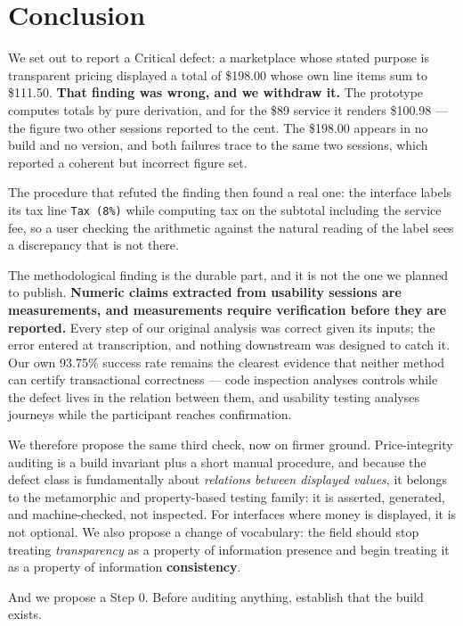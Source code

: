 \documentclass[conference]{IEEEtran}
\begin{document}
\section{Conclusion}

We set out to report a Critical defect: a marketplace whose stated purpose is transparent pricing
displayed a total of \$198.00 whose own line items sum to \$111.50. \textbf{That finding was wrong, and we
withdraw it.} The prototype computes totals by pure derivation, and for the \$89 service it renders
\$100.98 --- the figure two other sessions reported to the cent. The \$198.00 appears in no build and no
version, and both failures trace to the same two sessions, which reported a coherent but incorrect
figure set.

The procedure that refuted the finding then found a real one: the interface labels its tax line
\texttt{Tax (8\%)} while computing tax on the subtotal including the service fee, so a user checking the
arithmetic against the natural reading of the label sees a discrepancy that is not there.

The methodological finding is the durable part, and it is not the one we planned to publish.
\textbf{Numeric claims extracted from usability sessions are measurements, and measurements require
verification before they are reported.} Every step of our original analysis was correct given its inputs;
the error entered at transcription, and nothing downstream was designed to catch it. Our own 93.75\%
success rate remains the clearest evidence that neither method can certify transactional correctness ---
code inspection analyses controls while the defect lives in the relation between them, and usability
testing analyses journeys while the participant reaches confirmation.

We therefore propose the same third check, now on firmer ground. Price-integrity auditing is a build
invariant plus a short manual procedure, and because the defect class is fundamentally about
\emph{relations between displayed values}, it belongs to the metamorphic and property-based testing
family: it is asserted, generated, and machine-checked, not inspected. For interfaces where money is
displayed, it is not optional. We also propose a change of vocabulary: the field should stop treating
\emph{transparency} as a property of information presence and begin treating it as a property of
information \textbf{consistency}.

And we propose a Step 0. Before auditing anything, establish that the build exists.
\end{document}
